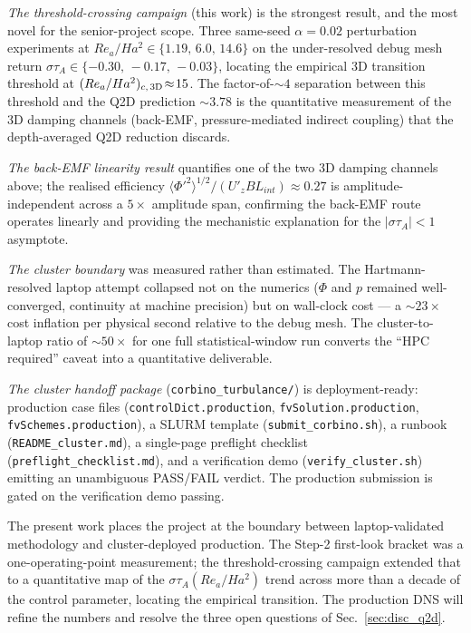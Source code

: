 \documentclass[aps,prl,twocolumn,superscriptaddress]{revtex4-2}
\begin{document}
\textit{The threshold-crossing campaign} (this work) is the
strongest result, and the most novel for the senior-project scope.
Three same-seed $\alpha = 0.02$ perturbation experiments at
$Re_a/Ha^{2}\in\{1.19,\,6.0,\,14.6\}$ on the under-resolved debug
mesh return $\sigma\tau_A\in\{-0.30,\,-0.17,\,-0.03\}$, locating the
empirical 3D transition threshold at
$(Re_a/Ha^{2})_{c,\,\rm 3D}\!\approx\!15$.  The factor-of-$\sim\!4$
separation between this threshold and the Q2D prediction
$\sim\!3.78$ is the quantitative measurement of the 3D damping
channels (back-EMF, pressure-mediated indirect coupling) that the
depth-averaged Q2D reduction discards.

\textit{The back-EMF linearity result} quantifies one of the two
3D damping channels above; the realised efficiency
$\langle\Phi'^{2}\rangle^{1/2}/(U'_z B L_{int})\approx 0.27$ is
amplitude-independent across a $5\!\times\!$ amplitude span,
confirming the back-EMF route operates linearly and providing the
mechanistic explanation for the $|\sigma\tau_A| < 1$ asymptote.

\textit{The cluster boundary} was measured rather than estimated.
The Hartmann-resolved laptop attempt collapsed not on the numerics
($\Phi$ and $p$ remained well-converged, continuity at machine
precision) but on wall-clock cost --- a $\sim\!23\!\times$ cost
inflation per physical second relative to the debug mesh.  The
cluster-to-laptop ratio of $\sim\!50\!\times$ for one full
statistical-window run converts the ``HPC required'' caveat into a
quantitative deliverable.

\textit{The cluster handoff package}
(\texttt{corbino\_turbulance/}) is deployment-ready: production case
files (\texttt{controlDict.production}, \texttt{fvSolution.production},
\texttt{fvSchemes.production}), a SLURM template
(\texttt{submit\_corbino.sh}), a runbook
(\texttt{README\_cluster.md}), a single-page preflight checklist
(\texttt{preflight\_checklist.md}), and a verification demo
(\texttt{verify\_cluster.sh}) emitting an unambiguous PASS/FAIL
verdict.  The production submission is gated on the verification
demo passing.

The present work places the project at the boundary between
laptop-validated methodology and cluster-deployed production.  The
Step-2 first-look bracket was a one-operating-point measurement; the
threshold-crossing campaign extended that to a quantitative map of
the $\sigma\tau_A(Re_a/Ha^{2})$ trend across more than a decade of
the control parameter, locating the empirical transition.  The
production DNS will refine the numbers and resolve the three open
questions of Sec.~\ref{sec:disc_q2d}.
\end{document}
